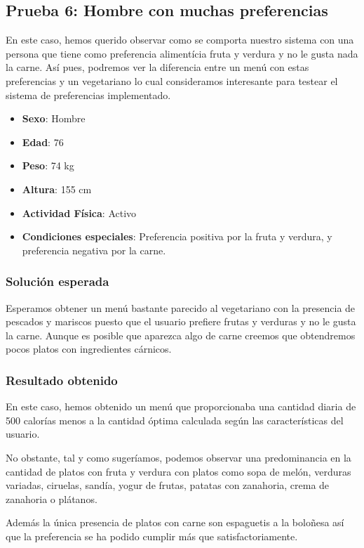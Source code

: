 \documentclass[11]{article}
\begin{document}
\subsection{Prueba 6: Hombre con muchas preferencias}
En este caso, hemos querido observar como se comporta nuestro sistema con una persona que tiene como preferencia alimentícia fruta y verdura y no le gusta nada la carne. Así pues, podremos ver la diferencia entre un menú con estas preferencias y un vegetariano lo cual consideramos interesante para testear el sistema de preferencias implementado. 

\begin{itemize}
\item \textbf{Sexo}: Hombre
\item \textbf{Edad}: 76
\item \textbf{Peso}: 74 kg
\item \textbf{Altura}: 155 cm
\item \textbf{Actividad Física}: Activo
\item \textbf{Condiciones especiales}: Preferencia positiva por la fruta y verdura, y preferencia negativa por la carne.
\end{itemize}
\subsubsection{Solución esperada}
Esperamos obtener un menú bastante parecido al vegetariano con la presencia de pescados y mariscos puesto que el usuario prefiere frutas y verduras y no le gusta la carne. Aunque es posible que aparezca algo de carne creemos que obtendremos pocos platos con ingredientes cárnicos. 

\subsubsection{Resultado obtenido}

En este caso, hemos obtenido un menú que proporcionaba una cantidad diaria de 500 calorías menos a la cantidad óptima calculada según las características del usuario. 

No obstante, tal y como sugeríamos, podemos observar una predominancia en la cantidad de platos con fruta y verdura con platos como sopa de melón, verduras variadas, ciruelas, sandía, yogur de frutas, patatas con zanahoria, crema de zanahoria o plátanos. 

Además la única presencia de platos con carne son espaguetis a la boloñesa así que la preferencia se ha podido cumplir más que satisfactoriamente. 
\end{document}
